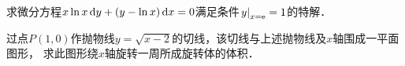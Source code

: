 \documentclass[plain,noanswer,medmath]{../../template/jnuexam}
\begin{document}






























\begin{problem}
求微分方程$x\ln x\mathop{}\!\mathrm{d} y+(y-\ln x)\mathop{}\!\mathrm{d} x=0$满足条件$\left.y\right|_{x=\mathrm{e}}=1$的特解．
\end{problem}


\begin{problem}
过点$P(1,0)$作抛物线$y=\sqrt{x-2}$的切线，该切线与上述抛物线及$x$轴围成一平面图形，
求此图形绕$x$轴旋转一周所成旋转体的体积．
\end{problem}














\end{document}
